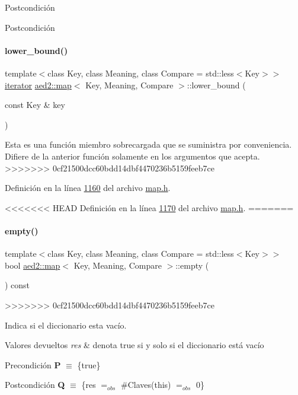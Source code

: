 \begin{DoxyPostcond}{\-Postcondición}
\begin{DoxyPostcond}{\-Postcondición}
\paragraph{\texorpdfstring{lower\+\_\+bound()}{lower\_bound()}\hspace{0.1cm}{\footnotesize\ttfamily [2/2]}}
{\footnotesize\ttfamily template$<$class Key, class Meaning, class Compare = std\+::less$<$\+Key$>$$>$ \\
\hyperlink{classaed2_1_1map_1_1iterator}{iterator} \hyperlink{classaed2_1_1map}{aed2\+::map}$<$ Key, Meaning, Compare $>$\+::lower\+\_\+bound (\begin{DoxyParamCaption}\item[{const Key \&}]{key }\end{DoxyParamCaption})\hspace{0.3cm}{\ttfamily [inline]}}

Esta es una función miembro sobrecargada que se suministra por conveniencia. Difiere de la anterior función solamente en los argumentos que acepta. 
>>>>>>> 0cf21500dcc60bdd14dbf4470236b5159feeb7ce

Definición en la línea \hyperlink{map_8h_source_l01160}{1160} del archivo \hyperlink{map_8h_source}{map.\+h}.

<<<<<<< HEAD
\-Definición en la línea \hyperlink{map_8h_source_l01170}{1170} del archivo \hyperlink{map_8h_source}{map.\-h}.
=======
\mbox{\label{classaed2_1_1map_a0dcb39283f4877ae59cb756ed1d0c048_a0dcb39283f4877ae59cb756ed1d0c048}} 
\paragraph{\texorpdfstring{empty()}{empty()}}
{\footnotesize\ttfamily template$<$class Key, class Meaning, class Compare = std\+::less$<$\+Key$>$$>$ \\
bool \hyperlink{classaed2_1_1map}{aed2\+::map}$<$ Key, Meaning, Compare $>$\+::empty (\begin{DoxyParamCaption}{ }\end{DoxyParamCaption}) const\hspace{0.3cm}{\ttfamily [inline]}}
>>>>>>> 0cf21500dcc60bdd14dbf4470236b5159feeb7ce



Indica si el diccionario esta vacío. 


\begin{DoxyRetVals}{Valores devueltos}
{\em res} & denota true si y solo si el diccionario está vacío\\
\hline
\end{DoxyRetVals}
\begin{DoxyPrecond}{Precondición}
{\bfseries P} $\equiv$ \{true\} 
\end{DoxyPrecond}
\begin{DoxyPostcond}{Postcondición}
{\bfseries Q} $\equiv$ \{res $=_{obs}$ \#Claves(this) $=_{obs}$ 0\}
\end{DoxyPostcond}


\end{DoxyPostcond}
\end{DoxyPostcond}
